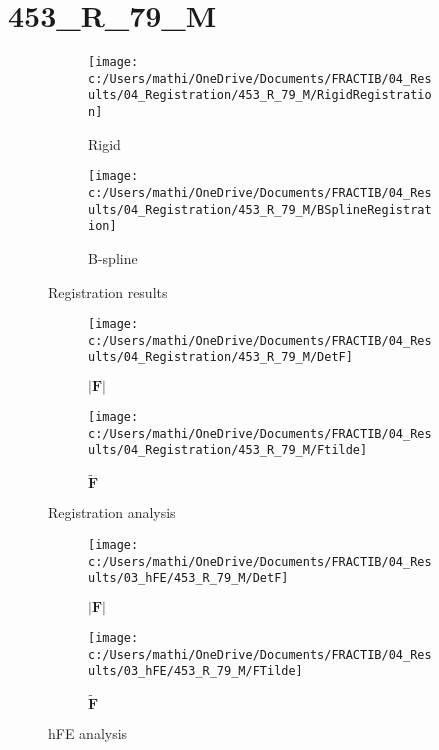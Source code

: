 \documentclass{article}%
\begin{document}
%
\newpage%
\section*{453\_R\_79\_M}%
\label{sec:453R79M}%


\begin{figure}[h!]%
\begin{subfigure}[b]{0.5\linewidth}%
\texttt{[image: c:/Users/mathi/OneDrive/Documents/FRACTIB/04\_Results/04\_Registration/453\_R\_79\_M/RigidRegistration]}%
\caption{Rigid}%
\end{subfigure}%
\begin{subfigure}[b]{0.5\linewidth}%
\texttt{[image: c:/Users/mathi/OneDrive/Documents/FRACTIB/04\_Results/04\_Registration/453\_R\_79\_M/BSplineRegistration]}%
\caption{B{-}spline}%
\end{subfigure}%
\caption{Registration results}%
\end{figure}

%


\begin{figure}[h!]%
\begin{subfigure}[b]{0.5\linewidth}%
\texttt{[image: c:/Users/mathi/OneDrive/Documents/FRACTIB/04\_Results/04\_Registration/453\_R\_79\_M/DetF]}%
\caption{$|\mathbf{F}|$}%
\end{subfigure}%
\begin{subfigure}[b]{0.5\linewidth}%
\texttt{[image: c:/Users/mathi/OneDrive/Documents/FRACTIB/04\_Results/04\_Registration/453\_R\_79\_M/Ftilde]}%
\caption{$\tilde{\mathbf{F}}$}%
\end{subfigure}%
\caption{Registration analysis}%
\end{figure}

%


\begin{figure}[h!]%
\begin{subfigure}[b]{0.5\linewidth}%
\texttt{[image: c:/Users/mathi/OneDrive/Documents/FRACTIB/04\_Results/03\_hFE/453\_R\_79\_M/DetF]}%
\caption{$|\mathbf{F}|$}%
\end{subfigure}%
\begin{subfigure}[b]{0.5\linewidth}%
\texttt{[image: c:/Users/mathi/OneDrive/Documents/FRACTIB/04\_Results/03\_hFE/453\_R\_79\_M/FTilde]}%
\caption{$\tilde{\mathbf{F}}$}%
\end{subfigure}%
\caption{hFE analysis}%
\end{figure}
\end{document}
